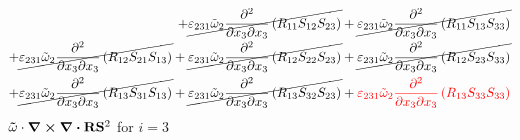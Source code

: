 \begin{equation}
\begin{split}
		+\cancel{\varepsilon_{231}\tilde{\omega}_{2}\pdv{}{x_{3}}{x_{3}}\left(R_{11}S_{12}S_{23}\right)}
		+\cancel{\varepsilon_{231}\tilde{\omega}_{2}\pdv{}{x_{3}}{x_{3}}\left(R_{11}S_{13}S_{33}\right)}\\
		+\cancel{\varepsilon_{231}\tilde{\omega}_{2}\pdv{}{x_{3}}{x_{3}}\left(R_{12}S_{21}S_{13}\right)}
		+\cancel{\varepsilon_{231}\tilde{\omega}_{2}\pdv{}{x_{3}}{x_{3}}\left(R_{12}S_{22}S_{23}\right)}
		+\cancel{\varepsilon_{231}\tilde{\omega}_{2}\pdv{}{x_{3}}{x_{3}}\left(R_{12}S_{23}S_{33}\right)}\\
		+\cancel{\varepsilon_{231}\tilde{\omega}_{2}\pdv{}{x_{3}}{x_{3}}\left(R_{13}S_{31}S_{13}\right)}
		+\cancel{\varepsilon_{231}\tilde{\omega}_{2}\pdv{}{x_{3}}{x_{3}}\left(R_{13}S_{32}S_{23}\right)}
		+{\color{red}\varepsilon_{231}\tilde{\omega}_{2}\pdv{}{x_{3}}{x_{3}}\left(R_{13}S_{33}S_{33}\right)}\\
	\end{split}
\end{equation}
$\mathbf{\tilde{\omega}}\cdot\curl \div \mathbf{R} \mathbf{S}^2$ for $i=3$
